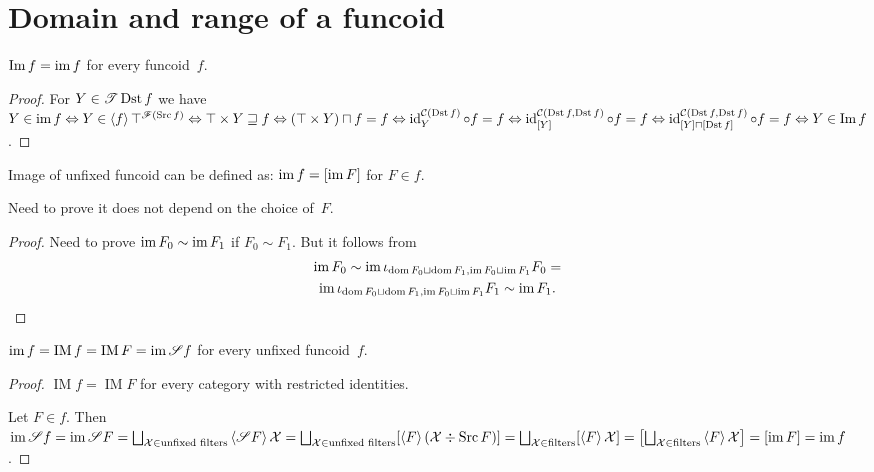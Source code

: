 \section{Domain and range of a funcoid}

\begin{thm}
$\operatorname{Im}f=\operatorname{im} f$ for every funcoid~$f$.
\end{thm}

\begin{proof}
For $Y\in\mathscr{T}\operatorname{Dst} f$ we have
$Y\in\operatorname{im} f\Leftrightarrow
Y\in\left\langle f\right\rangle\top^{\mathscr{F}(\operatorname{Src} f)}\Leftrightarrow
\top\times Y\sqsupseteq f\Leftrightarrow
(\top\times Y)\sqcap f=f\Leftrightarrow
\operatorname{id}^{\mathcal{C}(\operatorname{Dst} f)}_Y \circ f = f
\Leftrightarrow
\operatorname{id}^{\mathcal{C}(\operatorname{Dst} f,\operatorname{Dst} f)}_{[Y]} \circ f = f
\Leftrightarrow
\operatorname{id}^{\mathcal{C}(\operatorname{Dst} f,\operatorname{Dst} f)}_{[Y]\sqcap[\operatorname{Dst} f]} \circ f = f \Leftrightarrow
Y\in\operatorname{Im}f$.
\end{proof}

\begin{defn}
Image of unfixed funcoid can be defined as:
$\operatorname{im} f = [\operatorname{im} F]$ for $F\in f$.
\end{defn}

Need to prove it does not depend on the choice of~$F$.

\begin{proof}
Need to prove $\operatorname{im} F_0\sim\operatorname{im} F_1$ if $F_0\sim F_1$. But it follows from
\begin{multline*}
\operatorname{im} F_0\sim\operatorname{im}\iota_{\operatorname{dom} F_0\sqcup\operatorname{dom} F_1,\operatorname{im} F_0\sqcup\operatorname{im} F_1}F_0=\\\operatorname{im}\iota_{\operatorname{dom} F_0\sqcup\operatorname{dom} F_1,\operatorname{im} F_0\sqcup\operatorname{im} F_1}F_1\sim\operatorname{im} F_1.
\end{multline*}
\end{proof}

\begin{thm}
$\operatorname{im} f = \operatorname{IM}f = \operatorname{IM}F = \operatorname{im}\mathscr{S}f$ for every unfixed funcoid~$f$.
\end{thm}

\begin{proof}
$\operatorname{IM}f = \operatorname{IM}F$ for every category with restricted identities.

Let $F\in f$. Then $\im\mathscr{S}f = \im\mathscr{S}F = \bigsqcup_{\mathcal{X}\in\text{unfixed filters}}{\supfun{\mathscr{S}F}\mathcal{X}} = \bigsqcup_{\mathcal{X}\in\text{unfixed filters}}[\supfun{F}(\mathcal{X}\div\Src F)]=
\bigsqcup_{\mathcal{X}\in\text{filters}}[\supfun{F}\mathcal{X}]=
\left[\bigsqcup_{\mathcal{X}\in\text{filters}}\supfun{F}\mathcal{X}\right]=
[\im F]=\im f$.
\end{proof}

